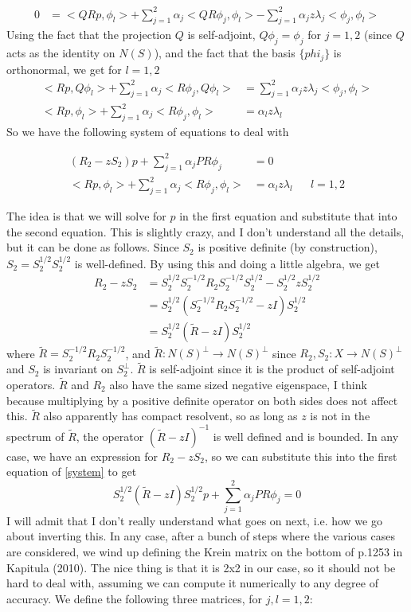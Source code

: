 \documentclass[12pt]{article}
\begin{document}
\begin{align}
0 &= <QRp, \phi_l> + \sum_{j=1}^2 \alpha_j <Q R \phi_j, \phi_l> - \sum_{j=1}^2 \alpha_j z \lambda_j <\phi_j, \phi_l>
\end{align}
Using the fact that the projection $Q$ is self-adjoint, $Q \phi_j = \phi_j$ for $j = 1, 2$ (since $Q$ acts as the identity on $N(S)$), and the fact that the basis $\{phi_j\}$ is orthonormal, we get for $l = 1, 2$
\begin{align}
<Rp, Q\phi_l> + \sum_{j=1}^2 \alpha_j <R \phi_j, Q\phi_l> &= \sum_{j=1}^2 \alpha_j z \lambda_j <\phi_j, \phi_l> \\
<Rp, \phi_l> + \sum_{j=1}^2 \alpha_j <R \phi_j, \phi_l> &= \alpha_l z \lambda_l
\end{align}
So we have the following system of equations to deal with

\begin{align}\label{system}
(R_2 - z S_2)p + \sum_{j=1}^2 \alpha_j P R \phi_j &= 0 \\
<Rp, \phi_l> + \sum_{j=1}^2 \alpha_j <R \phi_j, \phi_l> &= \alpha_l z \lambda_l && l = 1, 2
\end{align}

The idea is that we will solve for $p$ in the first equation and substitute that into the second equation. This is slightly crazy, and I don't understand all the details, but it can be done as follows. Since $S_2$ is positive definite (by construction), $S_2 = S_2^{1/2} S_2^{1/2}$ is well-defined. By using this and doing a little algebra, we get
\begin{align}
R_2 - z S_2 &= S_2^{1/2} S_2^{-1/2} R_2 S_2^{-1/2} S_2^{1/2} - S_2^{1/2} z S_2^{1/2} \\
&= S_2^{1/2} ( S_2^{-1/2} R_2 S_2^{-1/2} - z I ) S_2^{1/2} \\
&= S_2^{1/2} ( \tilde{R} - z I ) S_2^{1/2} 
\end{align}
where $\tilde{R} = S_2^{-1/2} R_2 S_2^{-1/2}$, and $\tilde{R}: N(S)^\perp \rightarrow N(S)^\perp$ since $R_2, S_2: X \rightarrow N(S)^\perp$ and $S_2$ is invariant on $S_2^\perp$. $\tilde{R}$ is self-adjoint since it is the product of self-adjoint operators. $\tilde{R}$ and $R_2$ also have the same sized negative eigenspace, I think because multiplying by a positive definite operator on both sides does not affect this. $\tilde{R}$ also apparently has compact resolvent, so as long as $z$ is not in the spectrum of $\tilde{R}$, the operator $( \tilde{R} - z I )^{-1}$ is well defined and is bounded. In any case, we have an expression for $R_2 - zS_2$, so we can substitute this into the first equation of \eqref{system} to get
\[
S_2^{1/2} ( \tilde{R} - z I ) S_2^{1/2} p + \sum_{j=1}^2 \alpha_j P R \phi_j = 0 
\]
I will admit that I don't really understand what goes on next, i.e. how we go about inverting this. In any case, after a bunch of steps where the various cases are considered, we wind up defining the Krein matrix on the bottom of p.1253 in Kapitula (2010). The nice thing is that it is 2x2 in our case, so it should not be hard to deal with, assuming we can compute it numerically to any degree of accuracy. We define the following three matrices, for $j, l = 1, 2$:
\end{document}
